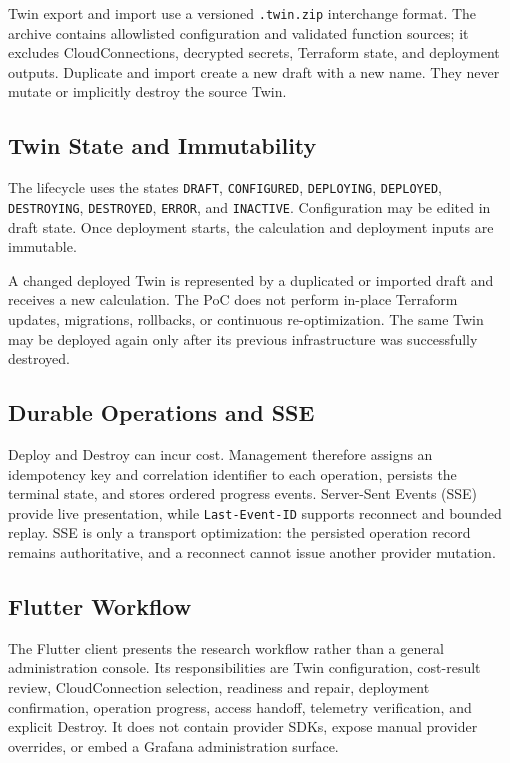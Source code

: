 Twin export and import use a versioned \texttt{.twin.zip} interchange format.
The archive contains allowlisted configuration and validated function sources;
it excludes CloudConnections, decrypted secrets, Terraform state, and
deployment outputs. Duplicate and import create a new draft with a new name.
They never mutate or implicitly destroy the source Twin.

\subsection{Twin State and Immutability}
\label{sec:twin-states}

The lifecycle uses the states \texttt{DRAFT}, \texttt{CONFIGURED},
\texttt{DEPLOYING}, \texttt{DEPLOYED}, \texttt{DESTROYING},
\texttt{DESTROYED}, \texttt{ERROR}, and \texttt{INACTIVE}. Configuration may be
edited in draft state. Once deployment starts, the calculation and deployment
inputs are immutable.

A changed deployed Twin is represented by a duplicated or imported draft and
receives a new calculation. The PoC does not perform in-place Terraform
updates, migrations, rollbacks, or continuous re-optimization. The same Twin
may be deployed again only after its previous infrastructure was successfully
destroyed.

\subsection{Durable Operations and SSE}
\label{sec:sse-streaming}

Deploy and Destroy can incur cost. Management therefore assigns an
idempotency key and correlation identifier to each operation, persists the
terminal state, and stores ordered progress events. Server-Sent Events (SSE)
provide live presentation, while \texttt{Last-Event-ID} supports reconnect and
bounded replay. SSE is only a transport optimization: the persisted operation
record remains authoritative, and a reconnect cannot issue another provider
mutation.

\subsection{Flutter Workflow}
\label{sec:flutter-ui}

The Flutter client presents the research workflow rather than a general
administration console. Its responsibilities are Twin configuration,
cost-result review, CloudConnection selection, readiness and repair,
deployment confirmation, operation progress, access handoff, telemetry
verification, and explicit Destroy. It does not contain provider SDKs, expose
manual provider overrides, or embed a Grafana administration surface.

